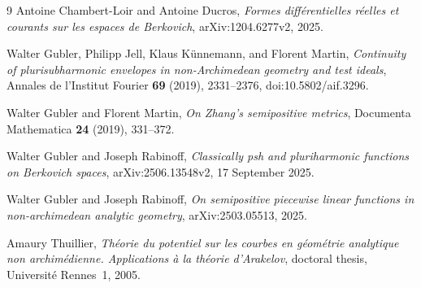 \begin{thebibliography}{9}
Antoine Chambert-Loir and Antoine Ducros,
\emph{Formes diff\'erentielles r\'eelles et courants sur les espaces de
Berkovich}, arXiv:1204.6277v2, 2025.

Walter Gubler, Philipp Jell, Klaus K\"unnemann, and Florent Martin,
\emph{Continuity of plurisubharmonic envelopes in non-Archimedean geometry
and test ideals}, Annales de l'Institut Fourier \textbf{69} (2019),
2331--2376, doi:10.5802/aif.3296.

Walter Gubler and Florent Martin,
\emph{On Zhang's semipositive metrics},
Documenta Mathematica \textbf{24} (2019), 331--372.

Walter Gubler and Joseph Rabinoff,
\emph{Classically psh and pluriharmonic functions on Berkovich spaces},
arXiv:2506.13548v2, 17 September 2025.

Walter Gubler and Joseph Rabinoff,
\emph{On semipositive piecewise linear functions in non-archimedean
analytic geometry}, arXiv:2503.05513, 2025.

Amaury Thuillier,
\emph{Th\'eorie du potentiel sur les courbes en g\'eom\'etrie analytique
non archim\'edienne. Applications \`a la th\'eorie d'Arakelov},
doctoral thesis, Universit\'e Rennes~1, 2005.
\end{thebibliography}
